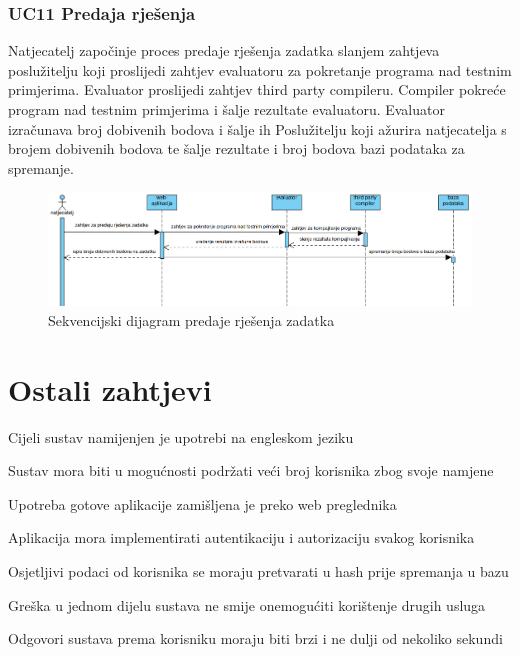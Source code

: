 				
				\clearpage 
				
				\subsubsection*{UC11 Predaja rješenja}
				
				Natjecatelj započinje proces predaje rješenja zadatka slanjem zahtjeva poslužitelju koji proslijedi zahtjev evaluatoru za pokretanje programa nad testnim primjerima. Evaluator proslijedi zahtjev third party compileru. Compiler pokreće program nad testnim primjerima i šalje rezultate evaluatoru. Evaluator izračunava broj dobivenih bodova i šalje ih Poslužitelju koji ažurira natjecatelja s brojem dobivenih bodova te šalje rezultate i broj bodova bazi podataka za spremanje.
				\vspace{20mm}

				\begin{figure}[htbp]
					\centering
					\includegraphics[width=\linewidth]{slike/predaja_rjesenja_zadatka.png}
					\caption{Sekvencijski dijagram predaje rješenja zadatka}\label{fig:seqdiag_rjesenja}
				\end{figure}


			\eject 
	
		\section{Ostali zahtjevi}
		
			\begin{packed_item}
				\item Cijeli sustav namijenjen je upotrebi na engleskom jeziku
				\item Sustav mora biti u mogućnosti podržati veći broj korisnika zbog svoje namjene
				\item Upotreba gotove aplikacije zamišljena je preko web preglednika
				\item Aplikacija mora implementirati autentikaciju i autorizaciju svakog korisnika
				\item Osjetljivi podaci od korisnika se moraju pretvarati u hash prije spremanja u bazu
				\item Greška u jednom dijelu sustava ne smije onemogućiti korištenje drugih usluga
				\item Odgovori sustava prema korisniku moraju biti brzi i ne dulji od nekoliko sekundi
			\end{packed_item}
			 
			 
			 
	